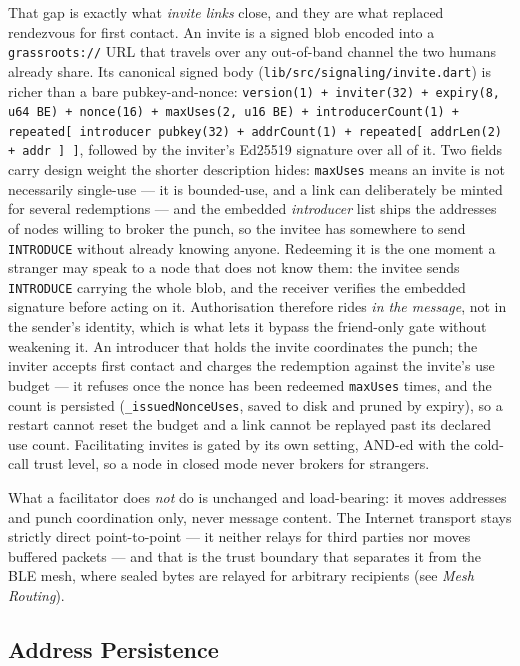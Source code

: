 \documentclass[11pt]{report}
\newcommand{\code}[1]{\texttt{\small #1}}
\begin{document}
That gap is exactly what \emph{invite links} close, and they are what replaced rendezvous for first contact. An invite is a signed blob encoded into a \code{grassroots://} URL that travels over any out-of-band channel the two humans already share. Its canonical signed body (\code{lib/src/signaling/invite.dart}) is richer than a bare pubkey-and-nonce: \code{version(1) + inviter(32) + expiry(8, u64 BE) + nonce(16) + maxUses(2, u16 BE) + introducerCount(1) + repeated[ introducer pubkey(32) + addrCount(1) + repeated[ addrLen(2) + addr ] ]}, followed by the inviter's Ed25519 signature over all of it. Two fields carry design weight the shorter description hides: \code{maxUses} means an invite is not necessarily single-use --- it is bounded-use, and a link can deliberately be minted for several redemptions --- and the embedded \emph{introducer} list ships the addresses of nodes willing to broker the punch, so the invitee has somewhere to send \code{INTRODUCE} without already knowing anyone. Redeeming it is the one moment a stranger may speak to a node that does not know them: the invitee sends \code{INTRODUCE} carrying the whole blob, and the receiver verifies the embedded signature before acting on it. Authorisation therefore rides \emph{in the message}, not in the sender's identity, which is what lets it bypass the friend-only gate without weakening it. An introducer that holds the invite coordinates the punch; the inviter accepts first contact and charges the redemption against the invite's use budget --- it refuses once the nonce has been redeemed \code{maxUses} times, and the count is persisted (\code{\_issuedNonceUses}, saved to disk and pruned by expiry), so a restart cannot reset the budget and a link cannot be replayed past its declared use count. Facilitating invites is gated by its own setting, AND-ed with the cold-call trust level, so a node in closed mode never brokers for strangers.

What a facilitator does \emph{not} do is unchanged and load-bearing: it moves addresses and punch coordination only, never message content. The Internet transport stays strictly direct point-to-point --- it neither relays for third parties nor moves buffered packets --- and that is the trust boundary that separates it from the BLE mesh, where sealed bytes are relayed for arbitrary recipients (see \emph{Mesh Routing}).

\subsection{Address Persistence}
\end{document}
